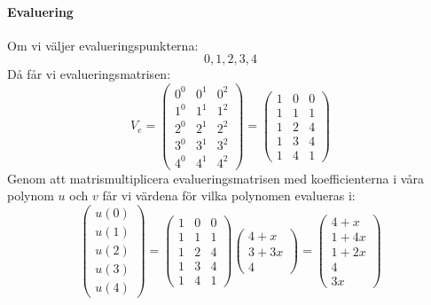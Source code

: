 \paragraph{Evaluering}
Om vi väljer evalueringspunkterna:
\begin{equation*}
  0, 1, 2, 3, 4
\end{equation*}
Då får vi evalueringsmatrisen:
\begin{equation*}
  V_e = \begin{pmatrix}
    0^0 & 0^1 & 0^2 \\
    1^0 & 1^1 & 1^2 \\
    2^0 & 2^1 & 2^2 \\
    3^0 & 3^1 & 3^2 \\
    4^0 & 4^1 & 4^2
  \end{pmatrix} =
  \begin{pmatrix}
    1 & 0 & 0 \\
    1 & 1 & 1 \\
    1 & 2 & 4 \\
    1 & 3 & 4 \\
    1 & 4 & 1
  \end{pmatrix}
\end{equation*}
Genom att matrismultiplicera evalueringsmatrisen med koefficienterna i våra
polynom $u$ och $v$ får vi värdena för vilka polynomen evalueras i:
\begin{equation*}
  \begin{pmatrix}
    u(0) \\
    u(1) \\
    u(2) \\
    u(3) \\
    u(4)
  \end{pmatrix} =
  \begin{pmatrix}
    1 & 0 & 0 \\
    1 & 1 & 1 \\
    1 & 2 & 4 \\
    1 & 3 & 4 \\
    1 & 4 & 1
  \end{pmatrix}
  \begin{pmatrix}
    4 + x \\
    3 + 3x \\
    4
  \end{pmatrix} =
  \begin{pmatrix}
    4 + x \\
    1 + 4x \\
    1 + 2x \\
    4 \\
    3x
  \end{pmatrix}
\end{equation*}
